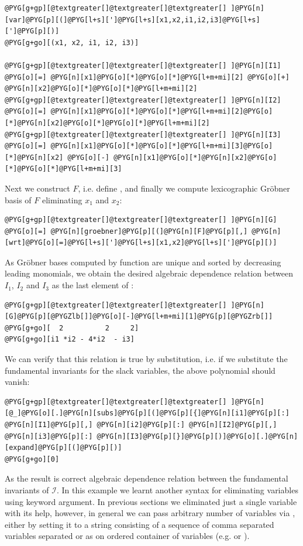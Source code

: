 \begin{Verbatim}[commandchars=@\[\]]
@PYG[g+gp][@textgreater[]@textgreater[]@textgreater[] ]@PYG[n][var]@PYG[p][(]@PYG[l+s][']@PYG[l+s][x1,x2,i1,i2,i3]@PYG[l+s][']@PYG[p][)]
@PYG[g+go][(x1, x2, i1, i2, i3)]

@PYG[g+gp][@textgreater[]@textgreater[]@textgreater[] ]@PYG[n][I1] @PYG[o][=] @PYG[n][x1]@PYG[o][*]@PYG[o][*]@PYG[l+m+mi][2] @PYG[o][+] @PYG[n][x2]@PYG[o][*]@PYG[o][*]@PYG[l+m+mi][2]
@PYG[g+gp][@textgreater[]@textgreater[]@textgreater[] ]@PYG[n][I2] @PYG[o][=] @PYG[n][x1]@PYG[o][*]@PYG[o][*]@PYG[l+m+mi][2]@PYG[o][*]@PYG[n][x2]@PYG[o][*]@PYG[o][*]@PYG[l+m+mi][2]
@PYG[g+gp][@textgreater[]@textgreater[]@textgreater[] ]@PYG[n][I3] @PYG[o][=] @PYG[n][x1]@PYG[o][*]@PYG[o][*]@PYG[l+m+mi][3]@PYG[o][*]@PYG[n][x2] @PYG[o][-] @PYG[n][x1]@PYG[o][*]@PYG[n][x2]@PYG[o][*]@PYG[o][*]@PYG[l+m+mi][3]
\end{Verbatim}
\noindent
Next we construct $F$, i.e. define , and finally we
compute lexicographic Gröbner basis of $F$ eliminating $x_1$ and $x_2$:

\begin{Verbatim}[commandchars=@\[\]]
@PYG[g+gp][@textgreater[]@textgreater[]@textgreater[] ]@PYG[n][G] @PYG[o][=] @PYG[n][groebner]@PYG[p][(]@PYG[n][F]@PYG[p][,] @PYG[n][wrt]@PYG[o][=]@PYG[l+s][']@PYG[l+s][x1,x2]@PYG[l+s][']@PYG[p][)]
\end{Verbatim}
\noindent
As Gröbner bases computed by  function are unique and sorted by
decreasing leading monomials, we obtain the desired algebraic dependence relation
between $I_1$, $I_2$ and $I_3$ as the last element of :

\begin{Verbatim}[commandchars=@\[\]]
@PYG[g+gp][@textgreater[]@textgreater[]@textgreater[] ]@PYG[n][G]@PYG[p][@PYGZlb[]]@PYG[o][-]@PYG[l+m+mi][1]@PYG[p][@PYGZrb[]]
@PYG[g+go][  2          2     2]
@PYG[g+go][i1 *i2 - 4*i2  - i3]
\end{Verbatim}
\noindent
We can verify that this relation is true by substitution, i.e. if we substitute the
fundamental invariants for the slack variables, the above polynomial should vanish:

\begin{Verbatim}[commandchars=@\[\]]
@PYG[g+gp][@textgreater[]@textgreater[]@textgreater[] ]@PYG[n][@_]@PYG[o][.]@PYG[n][subs]@PYG[p][(]@PYG[p][{]@PYG[n][i1]@PYG[p][:] @PYG[n][I1]@PYG[p][,] @PYG[n][i2]@PYG[p][:] @PYG[n][I2]@PYG[p][,] @PYG[n][i3]@PYG[p][:] @PYG[n][I3]@PYG[p][}]@PYG[p][)]@PYG[o][.]@PYG[n][expand]@PYG[p][(]@PYG[p][)]
@PYG[g+go][0]
\end{Verbatim}
\noindent
As the result  is correct algebraic dependence relation between the fundamental
invariants of $\mathcal{I}$. In this example we learnt another syntax for eliminating
variables using  keyword argument. In previous sections we eliminated just a single
variable with its help, however, in general we can pass arbitrary number of variables via
, either by setting it to a string consisting of a sequence of comma separated
variables separated or as on ordered container of variables (e.g.  or ).

